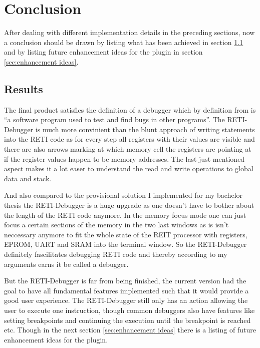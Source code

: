 \documentclass{report}
\begin{document}

\chapter{Conclusion}

After dealing with different implementation details in the preceding sections, now a conclusion should be drawn by listing what has been achieved in section \ref{sec:results} and by listing future enhancement ideas for the plugin in section \ref{sec:enhancement ideas}.

\section{Results}
\label{sec:results}

The final product satisfies the definition of a \alert{debugger} which by definition from \cite{Debugger2022} is \enquote{a software program used to test and find bugs in other programs}. The RETI-Debugger is much more convinient than the blunt approach of writing  statements into the RETI code as for every step all registers with their values are visible and there are also arrows marking at which memory cell the registers are pointing at if the register values happen to be memory addresses. The last just mentioned aspect makes it a lot easer to understand the read and write operations to global data and stack.

And also compared to the provisional solution I implemented for my bachelor thesis the RETI-Debugger is a huge upgrade as one doesn't have to bother about the length of the RETI code anymore. In the memory focus mode one can just focus a certain sections of the memory in the two last windows as is isn't neccessary anymore to fit the whole state of the REIT processor with registers, EPROM, UART and SRAM into the terminal window. So the RETI-Debugger definitely fascilitates debugging RETI code and thereby according to my arguments earns it be called a debugger.

But the RETI-Debugger is far from being finished, the current version had the goal to have all fundamental features implemented such that it would provide a good user experience. The RETI-Debugger still only has an action allowing the user to execute one instruction, though common debuggers also have features like setting breakpoints and continuing the execution until the breakpoint is reached etc. Though in the next section \ref{sec:enhancement ideas} there is a listing of future enhancement ideas for the plugin.
\end{document}
